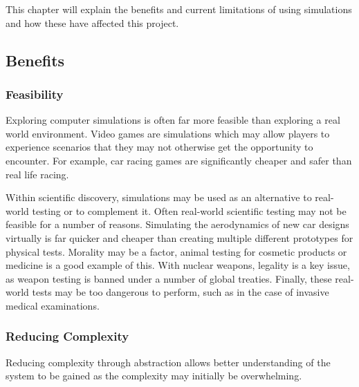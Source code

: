 \documentclass{UoYCSproject}
\begin{document}

This chapter will explain the benefits and current limitations of using simulations and how these have affected this project.

\subsection{Benefits}
\subsubsection{Feasibility}
Exploring computer simulations is often far more feasible than exploring a real world environment. Video games are simulations which may allow players to experience scenarios that they may not otherwise get the opportunity to encounter. For example, car racing games are significantly cheaper and safer than real life racing.

Within scientific discovery, simulations may be used as an alternative to real-world testing or to complement it. Often real-world scientific testing may not be feasible for a number of reasons. Simulating the aerodynamics of new car designs virtually is far quicker and cheaper than creating multiple different prototypes for physical tests. Morality may be a factor, animal testing for cosmetic products or medicine is a good example of this. With nuclear weapons, legality is a key issue, as weapon testing is banned under a number of global treaties\cite{partial_nuclear_test_ban_treaty, threshold_test_ban_treaty, comprehensive_nuclear_test_ban_treaty}. Finally, these real-world tests may be too dangerous to perform, such as in the case of invasive medical examinations. %


\subsubsection{Reducing Complexity}
Reducing complexity through abstraction allows better understanding of the system to be gained as the complexity may initially be overwhelming.
\end{document}
